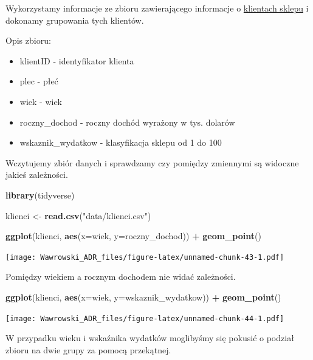 \documentclass[
]{book}
\newenvironment{Shaded}{\begin{snugshade}}{\end{snugshade}}
\newcommand{\DataTypeTok}[1]{\textcolor[rgb]{0.13,0.29,0.53}{#1}}
\newcommand{\KeywordTok}[1]{\textcolor[rgb]{0.13,0.29,0.53}{\textbf{#1}}}
\newcommand{\NormalTok}[1]{#1}
\newcommand{\OperatorTok}[1]{\textcolor[rgb]{0.81,0.36,0.00}{\textbf{#1}}}
\newcommand{\StringTok}[1]{\textcolor[rgb]{0.31,0.60,0.02}{#1}}
\providecommand{\tightlist}{%
  \setlength{\itemsep}{0pt}\setlength{\parskip}{0pt}}
\begin{document}
Wykorzystamy informacje ze zbioru zawierającego informacje o \href{data/klienci.csv}{klientach sklepu} i dokonamy grupowania tych klientów.

Opis zbioru:

\begin{itemize}
\tightlist
\item
  klientID - identyfikator klienta
\item
  plec - płeć
\item
  wiek - wiek
\item
  roczny\_dochod - roczny dochód wyrażony w tys. dolarów
\item
  wskaznik\_wydatkow - klasyfikacja sklepu od 1 do 100
\end{itemize}

Wczytujemy zbiór danych i sprawdzamy czy pomiędzy zmiennymi są widoczne jakieś zależności.

\begin{Shaded}
\begin{Highlighting}[]
\KeywordTok{library}\NormalTok{(tidyverse)}

\NormalTok{klienci <-}\StringTok{ }\KeywordTok{read.csv}\NormalTok{(}\StringTok{"data/klienci.csv"}\NormalTok{)}

\KeywordTok{ggplot}\NormalTok{(klienci, }\KeywordTok{aes}\NormalTok{(}\DataTypeTok{x=}\NormalTok{wiek, }\DataTypeTok{y=}\NormalTok{roczny_dochod)) }\OperatorTok{+}
\StringTok{  }\KeywordTok{geom_point}\NormalTok{()}
\end{Highlighting}
\end{Shaded}

\texttt{[image: Wawrowski\_ADR\_files/figure-latex/unnamed-chunk-43-1.pdf]}

Pomiędzy wiekiem a rocznym dochodem nie widać zależności.

\begin{Shaded}
\begin{Highlighting}[]
\KeywordTok{ggplot}\NormalTok{(klienci, }\KeywordTok{aes}\NormalTok{(}\DataTypeTok{x=}\NormalTok{wiek, }\DataTypeTok{y=}\NormalTok{wskaznik_wydatkow)) }\OperatorTok{+}
\StringTok{  }\KeywordTok{geom_point}\NormalTok{()}
\end{Highlighting}
\end{Shaded}

\texttt{[image: Wawrowski\_ADR\_files/figure-latex/unnamed-chunk-44-1.pdf]}

W przypadku wieku i wskaźnika wydatków moglibyśmy się pokusić o podział zbioru na dwie grupy za pomocą przekątnej.
\end{document}
